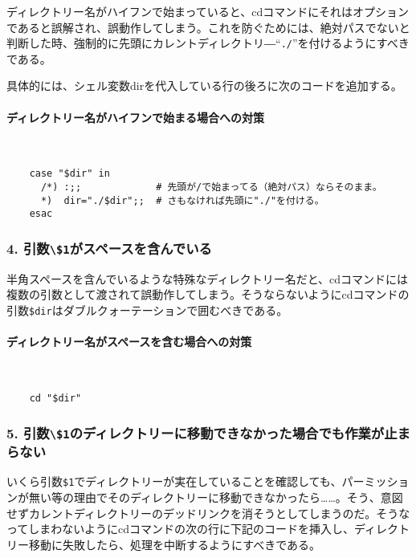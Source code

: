ディレクトリー名がハイフンで始まっていると、cdコマンドにそれはオプションであると誤解され、誤動作してしまう。これを防ぐためには、絶対パスでないと判断した時、強制的に先頭にカレントディレクトリ―``\verb|./|''を付けるようにすべきである。

具体的には、シェル変数dirを代入している行の後ろに次のコードを追加する。

\paragraph{ディレクトリー名がハイフンで始まる場合への対策} 　\\
\begin{frameboxit}{160.0mm}
\begin{verbatim}
	case "$dir" in
	  /*) :;;             # 先頭が/で始まってる（絶対パス）ならそのまま。
	  *)  dir="./$dir";;  # さもなければ先頭に"./"を付ける。
	esac
\end{verbatim}
\end{frameboxit}

\subsubsection*{4. 引数\verb|\$1|がスペースを含んでいる}

半角スペースを含んでいるような特殊なディレクトリー名だと、cdコマンドには複数の引数として渡されて誤動作してしまう。そうならないようにcdコマンドの引数\verb|$dir|はダブルクォーテーションで囲むべきである。

\paragraph{ディレクトリー名がスペースを含む場合への対策} 　\\
\begin{frameboxit}{160.0mm}
\begin{verbatim}
	cd "$dir"
\end{verbatim}
\end{frameboxit}

\subsubsection*{5. 引数\verb|\$1|のディレクトリーに移動できなかった場合でも作業が止まらない}

いくら引数\verb|$1|でディレクトリーが実在していることを確認しても、パーミッションが無い等の理由でそのディレクトリーに移動できなかったら……。そう、意図せずカレントディレクトリーのデッドリンクを消そうとしてしまうのだ。そうなってしまわないようにcdコマンドの次の行に下記のコードを挿入し、ディレクトリー移動に失敗したら、処理を中断するようにすべきである。

